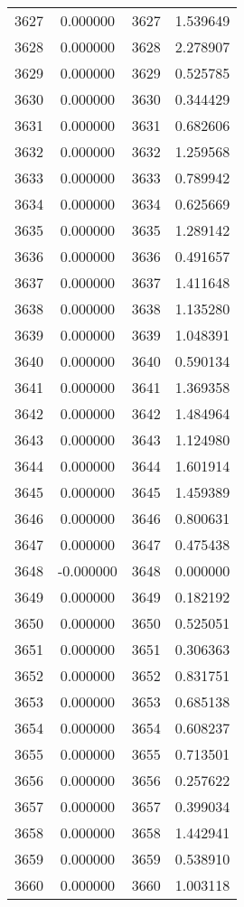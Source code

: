 \documentclass[12pt]{article}
\begin{document}
\begin{longtable}{@{}cccc@{}}
3627 & 0.000000 & 3627 & 1.539649 \\
3628 & 0.000000 & 3628 & 2.278907 \\
3629 & 0.000000 & 3629 & 0.525785 \\
3630 & 0.000000 & 3630 & 0.344429 \\
3631 & 0.000000 & 3631 & 0.682606 \\
3632 & 0.000000 & 3632 & 1.259568 \\
3633 & 0.000000 & 3633 & 0.789942 \\
3634 & 0.000000 & 3634 & 0.625669 \\
3635 & 0.000000 & 3635 & 1.289142 \\
3636 & 0.000000 & 3636 & 0.491657 \\
3637 & 0.000000 & 3637 & 1.411648 \\
3638 & 0.000000 & 3638 & 1.135280 \\
3639 & 0.000000 & 3639 & 1.048391 \\
3640 & 0.000000 & 3640 & 0.590134 \\
3641 & 0.000000 & 3641 & 1.369358 \\
3642 & 0.000000 & 3642 & 1.484964 \\
3643 & 0.000000 & 3643 & 1.124980 \\
3644 & 0.000000 & 3644 & 1.601914 \\
3645 & 0.000000 & 3645 & 1.459389 \\
3646 & 0.000000 & 3646 & 0.800631 \\
3647 & 0.000000 & 3647 & 0.475438 \\
3648 & -0.000000 & 3648 & 0.000000 \\
3649 & 0.000000 & 3649 & 0.182192 \\
3650 & 0.000000 & 3650 & 0.525051 \\
3651 & 0.000000 & 3651 & 0.306363 \\
3652 & 0.000000 & 3652 & 0.831751 \\
3653 & 0.000000 & 3653 & 0.685138 \\
3654 & 0.000000 & 3654 & 0.608237 \\
3655 & 0.000000 & 3655 & 0.713501 \\
3656 & 0.000000 & 3656 & 0.257622 \\
3657 & 0.000000 & 3657 & 0.399034 \\
3658 & 0.000000 & 3658 & 1.442941 \\
3659 & 0.000000 & 3659 & 0.538910 \\
3660 & 0.000000 & 3660 & 1.003118 \\

\end{longtable}
\end{document}
